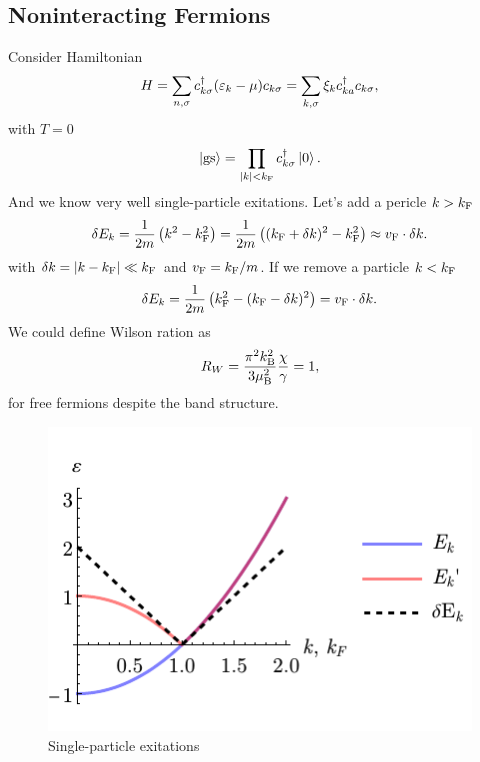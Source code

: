 \subsection*{Noninteracting Fermions}

Consider Hamiltonian
\begin{equation*}
	H = \sum_{n, \sigma} c_{k \sigma}^{\dag} (\varepsilon_k - \mu) c_{k\sigma} = \sum_{k, \sigma} \xi_k c_{ka}^{\dag} c_{k \sigma},
\end{equation*}
with $T=0$ 
\begin{equation*}
	\left| \text{gs} \right\rangle = \prod_{|k| < k_{\textnormal{F}}} c_{k \sigma}^{\dag} \left| 0 \right\rangle.
\end{equation*}
And we know very well single-particle exitations. Let's add a pericle $k > k_{\textnormal{F}}$
\begin{equation*}
	\delta E_k = \frac{1}{2m}\left(k^2 - k_{\textnormal{F}}^2\right) = \frac{1}{2m} \left(
		(k_{\textnormal{F}} + \delta k)^2 - k_{\textnormal{F}}^2
	\right) \approx v_{\textnormal{F}} \cdot \delta k.
\end{equation*}
with $\delta k = |k-k_{\textnormal{F}}| \ll k_{\textnormal{F}}$ and $v_{\textnormal{F}} = k_{\textnormal{F}} / m$. If we remove a particle $k < k_{\textnormal{F}}$ 
\begin{equation*}
	\delta E_k = \frac{1}{2m}\left(k_{\textnormal{F}}^2 - (k_{\textnormal{F}} - \delta k)^2\right) = v_{\textnormal{F}} \cdot \delta k.
\end{equation*}
We could define Wilson ration as
\begin{equation*}
	R_W = \frac{\pi^2 k_{\textnormal{B}}^2}{3 \mu_{\textnormal{B}}^2} \frac{\chi}{\gamma} = 1,
\end{equation*}
for free fermions despite the band structure. 

\begin{figure}[h]
    \centering
    \includegraphics{imgs/FS.pdf}
    \caption{Single-particle exitations}
    \label{fig:1}
\end{figure}


